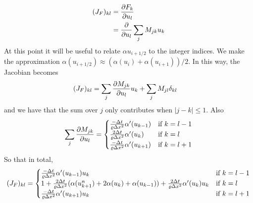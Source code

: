 \documentclass[12pt]{article}
\begin{document}
\begin{align}
 (J_F)_{kl} &= {\partial F_k \over \partial u_l} \\
 & = {\partial \over \partial u_l} \sum_j M_{jk}u_k
\end{align}
At this point it will be useful to relate $\alpha{u_{i+1/2}}$ to the integer indices. We make the approximation $\alpha(u_{i+1/2}) \approx (\alpha(u_i) + \alpha(u_{i+1}))/2$. In this way, the Jacobian becomes
\begin{align}
 (J_F)_{kl} &= \sum_j {\partial M_{jk} \over \partial u_l}u_k + \sum_{j} M_{jl}\delta_{kl}
\end{align}
and we have that the sum over $j$ only contributes when $|j-k|\le 1$. Also
\begin{align}
 \sum_j {\partial M_{jk} \over \partial u_l} = \begin{cases}
                                                {-\Delta t \over \varrho \Delta x^2}\alpha'(u_{k-1}) & \text{if } k=l-1 \\
                                                {2\Delta t \over \varrho \Delta x^2}\alpha'(u_{k}) & \text{if } k=l \\
                                                {-\Delta t \over \varrho \Delta x^2}\alpha'(u_{k+1}) & \text{if } k=l+1 \\
                                               \end{cases}
\end{align}
So that in total, 
\begin{align}
 (J_F)_{kl} = \begin{cases}
                                                {-\Delta t \over \varrho \Delta x^2}\alpha'(u_{k-1})u_k & \text{if } k=l-1 \\
                                                1+{2\Delta t \over \varrho \Delta x^2}(\alpha(u_{k+1}^n) + 2\alpha(u_k) +\alpha(u_{k-1}))+{2\Delta t \over \varrho \Delta x^2}\alpha'(u_{k})u_k & \text{if } k=l \\
                                                {-\Delta t \over \varrho \Delta x^2}\alpha'(u_{k+1})u_k & \text{if } k=l+1 \\
                                               \end{cases}
\end{align}
\end{document}
